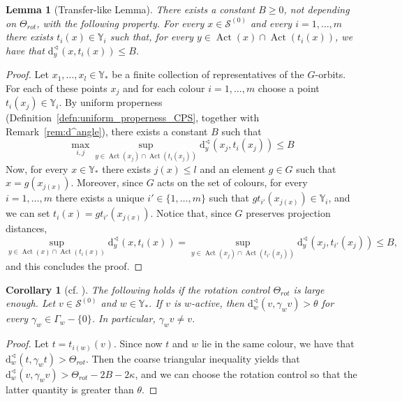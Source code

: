 \documentclass[svgnames]{amsart}
\theoremstyle{plain}
\newtheorem{lemma}[thm]{Lemma}
\newtheorem{cor}[thm]{Corollary}
\theoremstyle{definition}
\newcommand{\dist}{\mathrm{d}}
\newcommand{\Act}{\operatorname{Act}}
\newcommand{\calS}{\mathcal{S}}
\renewcommand{\angle}{\sphericalangle}
\begin{document}
\begin{lemma}[Transfer-like Lemma]\label{lem:transfer_like}
There exists a constant $B\ge 0$, not depending on $\Theta_{rot}$, with the following property. For every $x\in \calS^{(0)}$ and every $i=1,\ldots,m$ there exists $t_i(x)\in\mathbb{Y}_i$ such that, for every $y\in \Act(x)\cap \Act(t_i(x))$, we have that $\dist^\angle_y(x, t_i(x))\le B$. 
\end{lemma}

\begin{proof}
Let $x_1,\ldots, x_l\in \mathbb{Y}_*$ be a finite collection of representatives of the $G$-orbits. For each of these points $x_j$ and for each colour $i=1,\ldots, m$ choose a point $t_i(x_j)\in\mathbb{Y}_i$. By uniform properness (Definition~\ref{defn:uniform_properness_CPS}, together with Remark~\ref{rem:d^angle}), there exists a constant $B$ such that
$$\max_{i,j}\sup_{y\in\Act(x_j)\cap \Act(t_i(x_j))} \dist^\angle_y(x_j, t_i(x_j))\le B$$
Now, for every $x\in \mathbb{Y}_*$ there exists $j(x)\le l$ and an element $g\in G$ such that $x=g(x_{j(x)})$. Moreover, since $G$ acts on the set of colours, for every $i=1,\ldots, m$ there exists a unique $i'\in\{1,\ldots, m\}$ such that $gt_{i'}(x_{j(x)})\in \mathbb{Y}_{i}$, and we can set $t_i(x)=gt_{i'}(x_{j(x)})$. 
Notice that, since $G$ preserves projection distances, 
$$\sup_{y\in\Act(x)\cap \Act(t_i(x))} \dist^\angle_y(x, t_i(x))=\sup_{y\in\Act(x_j)\cap \Act(t_{i'}(x_j))} \dist^\angle_y(x_j, t_{i'}(x_j))\le B,$$
and this concludes the proof.
\end{proof}

\begin{cor}[{cf. \cite[Corollary 1.8]{dfdt}}]\label{cor:spostamento}
    The following holds if the rotation control $\Theta_{rot}$ is large enough. Let $v\in\calS^{(0)}$ and $w\in \mathbb{Y}_*$. If $v$ is $w$-active, then $\dist^\angle_w(v, \gamma_w v)>\theta$ for every $\gamma_w\in\Gamma_w-\{0\}$. In particular, $\gamma_w v\neq v$.
\end{cor}

\begin{proof}
    Let $t=t_{i(w)}(v)$. Since now $t$ and $w$ lie in the same colour, we have that $\dist^\angle_w(t, \gamma_w t)>\Theta_{rot}$. Then the coarse triangular inequality yields that $\dist^\angle_w(v, \gamma_w v)>\Theta_{rot}-2B-2\kappa$, and we can choose the rotation control so that the latter quantity is greater than $\theta$.
\end{proof}
\end{document}
